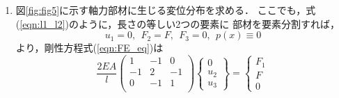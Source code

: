 \documentclass[10pt,a4j]{jarticle}
\begin{document}
\begin{enumerate}
\begin{equation}
\begin{array}{cc}
		2 & -1  \\
		-1 & 1 
	\end{array}
	\right)
	\left\{
	\begin{array}{c}
		u_2 \\
		u_3
	\end{array}
	\right\}
	=
	\frac{p_0l}{4}
	\left\{
	\begin{array}{c}
		2 \\
		1 
	\end{array}
	\right\} 
	\label{eqn:}
\end{equation}
を解けば，
\begin{equation}
	u_2=\frac{3}{8}\frac{p_0l^2}{EA}, \ \ 
	u_3=\frac{1}{2}\frac{p_0l^2}{EA}
	\label{eqn:u_nd_ex1}
\end{equation}
が得られる．これを，式(\ref{eqn:FE_eq_ex1})に代入すれば，全体節点1における力
(反力)が$F_1=-p_0l$と求められる．
要素$e$における変位の近似解$\tilde u(x_e)$は，式(\ref{eqn:u_nd_ex1})を
\begin{equation}
	\tilde u(x_e) =\sum_{i=1}^2 u^e_i\phi^e_i(x_e), \ \ (0\leq x_e \leq l_e)
\end{equation}
に代入することで得られる．ここでは，変位分布を要素毎に1次式で
近似しているため，2次式で与えられる厳密解には一致し得ない．
しかしながら，厳密解(微分方程式の厳密な解)と比較すると，
部材全体の変位分布を一つの直線で 近似よりも解の精度が向上している
ことを確かめることができる．
\item
図\ref{fig:fig5}に示す軸力部材に生じる変位分布を求める．
ここでも，式(\ref{eqn:l1_l2})のように，長さの等しい2つの要素に
部材を要素分割すれば，
\begin{equation}
	u_1=0, \ \ F_2=F,\ \ F_3=0, \ \ p(x)\equiv 0
\end{equation}
より，剛性方程式(\ref{eqn:FE_eq})は
\begin{equation}
	\frac{2EA}{l}
	\left(
	\begin{array}{ccc}
		1 & -1  & 0 \\
		-1 & 2 & -1 \\
		0 & -1 & 1  \\
	\end{array}
	\right)
	\left\{
	\begin{array}{c}
		0 \\
		u_2 \\
		u_3
	\end{array}
	\right\}
	=
	\left\{
	\begin{array}{c}
		F_1 \\
		F  \\
		0  

\end{array}
\end{equation}
\end{enumerate}
\end{document}
